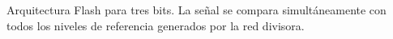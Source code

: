 \begin{marginfigure}
    \caption[Arquitectura ADC Flash de tres bits.]{Arquitectura Flash para tres bits. La señal se compara simultáneamente con todos los niveles de referencia generados por la red divisora.}\label{fig:adc_flash}
\end{marginfigure}

